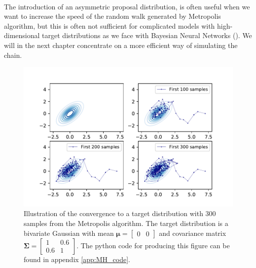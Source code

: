 \\
The introduction of an asymmetric proposal distribution, is often useful when we want to increase the speed of the random walk generated by Metropolis algorithm, but this is often not sufficient for complicated models with high-dimensional target distributions as we face with Bayesian Neural Networks (\cite{gelmanbda04}). We will in the next chapter concentrate on a more efficient way of simulating the chain.
\begin{figure}
    \centering
    \includegraphics[width=\textwidth, height=\textheight, keepaspectratio]{pics/mh_randomWalk_behavior.pdf}
    \caption{Illustration of the convergence to a target distribution with 300 samples from the Metropolis algorithm. The target distribution is a bivariate Gaussian with mean 
        $\boldsymbol{\mu}= \begin{bmatrix}
            0 & 0
            \end{bmatrix}$ and covariance matrix
            $\boldsymbol{\Sigma}= 
            \begin{bmatrix}
                1 & 0.6\\
                0.6 & 1   
            \end{bmatrix}$. The python code for producing this figure can be found in appendix \ref{app:MH_code}.
    }
    \label{fig:MH_sampling}
\end{figure}
\clearpage

